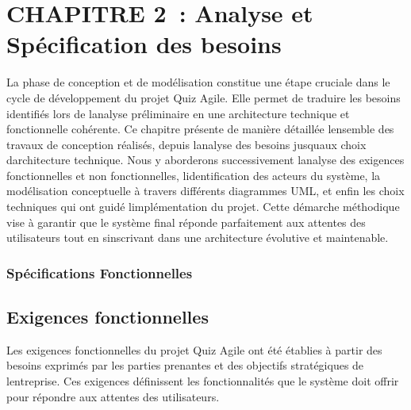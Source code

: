 \documentclass[12pt,a4paper,twoside,openright]{report}
\begin{document}
\hypertarget{section-2}{%
\section{}\label{section-2}}

\hypertarget{chapitre-2-analyse-et-spuxe9cification-des-besoins}{%
\section{CHAPITRE 2~: Analyse et Spécification des
besoins}\label{chapitre-2-analyse-et-spuxe9cification-des-besoins}}

La phase de conception et de modélisation constitue une étape cruciale
dans le cycle de développement du projet Quiz Agile. Elle permet de
traduire les besoins identifiés lors de l\textquotesingle analyse
préliminaire en une architecture technique et fonctionnelle cohérente.
Ce chapitre présente de manière détaillée l\textquotesingle ensemble des
travaux de conception réalisés, depuis l\textquotesingle analyse des
besoins jusqu\textquotesingle aux choix d\textquotesingle architecture
technique. Nous y aborderons successivement l\textquotesingle analyse
des exigences fonctionnelles et non fonctionnelles,
l\textquotesingle identification des acteurs du système, la modélisation
conceptuelle à travers différents diagrammes UML, et enfin les choix
techniques qui ont guidé l\textquotesingle implémentation du projet.
Cette démarche méthodique vise à garantir que le système final réponde
parfaitement aux attentes des utilisateurs tout en
s\textquotesingle inscrivant dans une architecture évolutive et
maintenable.

\hypertarget{spuxe9cifications-fonctionnelles}{%
\subsubsection{Spécifications
Fonctionnelles}\label{spuxe9cifications-fonctionnelles}}

\hypertarget{exigences-fonctionnelles}{%
\subsection{Exigences fonctionnelles}\label{exigences-fonctionnelles}}

Les exigences fonctionnelles du projet Quiz Agile ont été établies à
partir des besoins exprimés par les parties prenantes et des objectifs
stratégiques de l\textquotesingle entreprise. Ces exigences définissent
les fonctionnalités que le système doit offrir pour répondre aux
attentes des utilisateurs.
\end{document}
